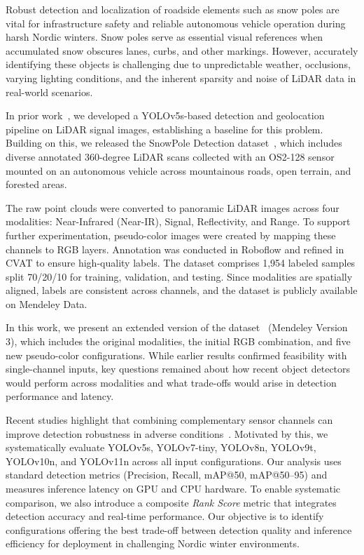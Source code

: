 \documentclass[runningheads]{llncs}
\begin{document}
Robust detection and localization of roadside elements such as snow poles are vital for infrastructure safety and reliable autonomous vehicle operation during harsh Nordic winters. Snow poles serve as essential visual references when accumulated snow obscures lanes, curbs, and other markings. However, accurately identifying these objects is challenging due to unpredictable weather, occlusions, varying lighting conditions, and the inherent sparsity and noise of LiDAR data in real-world scenarios.

In prior work~\cite{bavirisetti2024pole}, we developed a YOLOv5s-based detection and geolocation pipeline on LiDAR signal images, establishing a baseline for this problem. Building on this, we released the SnowPole Detection dataset~\cite{bavirisetti2025snowpole}, which includes diverse annotated 360-degree LiDAR scans collected with an OS2-128 sensor mounted on an autonomous vehicle across mountainous roads, open terrain, and forested areas.

The raw point clouds were converted to panoramic LiDAR images across four modalities: Near-Infrared (Near-IR), Signal, Reflectivity, and Range. To support further experimentation, pseudo-color images were created by mapping these channels to RGB layers. Annotation was conducted in Roboflow and refined in CVAT to ensure high-quality labels. The dataset comprises 1,954 labeled samples split 70/20/10 for training, validation, and testing. Since modalities are spatially aligned, labels are consistent across channels, and the dataset is publicly available on Mendeley Data.

In this work, we present an extended version of the dataset~\cite{bavirisetti2025extended} (Mendeley Version 3), which includes the original modalities, the initial RGB combination, and five new pseudo-color configurations. While earlier results confirmed feasibility with single-channel inputs, key questions remained about how recent object detectors would perform across modalities and what trade-offs would arise in detection performance and latency.

Recent studies highlight that combining complementary sensor channels can improve detection robustness in adverse conditions~\cite{zafar2024realtime,nature2023fusion}. Motivated by this, we systematically evaluate YOLOv5s, YOLOv7-tiny, YOLOv8n, YOLOv9t, YOLOv10n, and YOLOv11n across all input configurations. Our analysis uses standard detection metrics (Precision, Recall, mAP@50, mAP@50--95) and measures inference latency on GPU and CPU hardware. To enable systematic comparison, we also introduce a composite \emph{Rank Score} metric that integrates detection accuracy and real-time performance. Our objective is to identify configurations offering the best trade-off between detection quality and inference efficiency for deployment in challenging Nordic winter environments.
\end{document}
